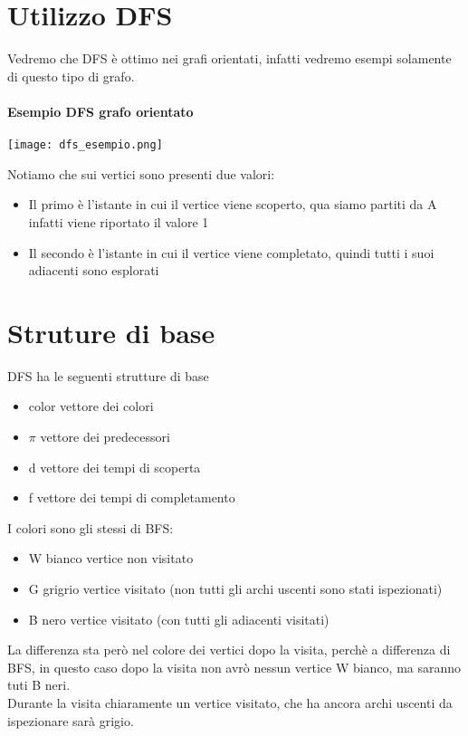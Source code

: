 \section{Utilizzo DFS}
Vedremo che DFS è ottimo nei grafi orientati, infatti vedremo esempi solamente di questo
tipo di grafo.
\paragraph*{Esempio DFS grafo orientato}
\begin{center}
    \texttt{[image: dfs\_esempio.png]}
\end{center}
Notiamo che sui vertici sono presenti due valori:
\begin{itemize}
    \item Il primo è l'istante in cui il vertice viene scoperto, qua siamo partiti da A infatti viene
    riportato il valore 1
    \item Il secondo è l'istante in cui il vertice viene completato, quindi tutti i suoi
    adiacenti sono esplorati
\end{itemize}
\section{Struture di base}
DFS ha le seguenti strutture di base
\begin{itemize}
    \item color \ra vettore dei colori
    \item $\pi$ \ra vettore dei predecessori
    \item d \ra vettore dei tempi di scoperta
    \item f \ra vettore dei tempi di completamento
\end{itemize}
I colori sono gli stessi di BFS:
\begin{itemize}
    \item W bianco \ra vertice non visitato
    \item G grigrio \ra vertice visitato (non tutti gli archi uscenti sono stati ispezionati)
    \item B nero \ra vertice visitato (con tutti gli adiacenti visitati)
\end{itemize}
La differenza sta però nel colore dei vertici dopo la visita, perchè a differenza di BFS,
in questo caso dopo la visita non avrò nessun vertice W bianco, ma saranno tuti B neri.\\
Durante la visita chiaramente un vertice visitato, che ha ancora archi uscenti da ispezionare
sarà grigio.
